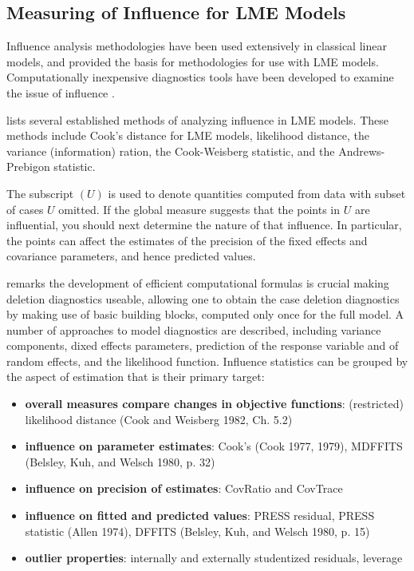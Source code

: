 \documentclass[12pt, a4paper]{report}
\theoremstyle{plain}
\theoremstyle{definition}
\theoremstyle{remark}
\begin{document}
%

\newpage
\subsection{Measuring of Influence for LME Models}
	Influence analysis methodologies have been used extensively in classical linear models, and provided the basis for methodologies for use with LME models. Computationally inexpensive diagnostics tools have been developed to examine the issue of influence \citep{Zewotir}. 
	
	\citet{Zewotir} lists several established methods of analyzing influence in LME models. These methods include Cook's distance for LME models,
	 likelihood distance,
	the variance (information) ration,
	the  Cook-Weisberg statistic, and
	the  Andrews-Prebigon statistic.
	
	The subscript $(U)$ is used to denote quantities computed from data with subset of cases $U$ omitted.
	If the global measure suggests that the points in $U$ are influential, you should next determine the nature of
	that influence. In particular, the points can affect the estimates of the precision of the fixed effects and covariance parameters, and hence predicted values.

	\citet{Zewotir} remarks the development of efficient computational formulas is crucial making deletion diagnostics useable, allowing one to obtain the  case deletion diagnostics by making use of basic building blocks, computed only once for the full model. A number of approaches to model diagnostics are described, including variance components, dixed effects parameters, prediction of the response variable and of random effects, and the likelihood function. Influence statistics can be grouped by the aspect of estimation that is their primary target:
	\begin{itemize}
		\item \textbf{overall measures compare changes in objective functions}: (restricted) likelihood distance (Cook and Weisberg 1982, Ch. 5.2)
		\item \textbf{influence on parameter estimates}: Cook's  (Cook 1977, 1979), MDFFITS (Belsley, Kuh, and Welsch 1980, p. 32)
		\item \textbf{influence on precision of estimates}: CovRatio and CovTrace
		\item \textbf{influence on fitted and predicted values}: PRESS residual, PRESS statistic (Allen 1974), DFFITS (Belsley, Kuh, and Welsch 1980, p. 15)
		\item \textbf{outlier properties}: internally and externally studentized residuals, leverage
	\end{itemize}
	
\end{document}
